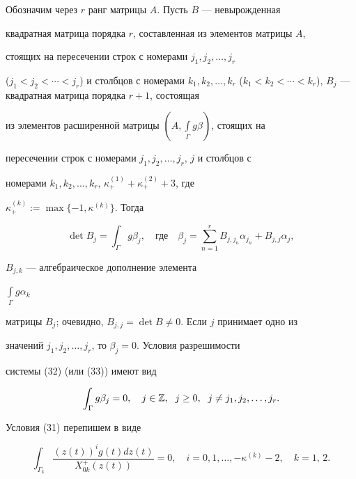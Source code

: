 Обозначим через $r$ ранг матрицы $A$. Пусть $B$ --- невырожденная


квадратная матрица порядка $r$, составленная из элементов матрицы $A$,


стоящих на пересечении строк с номерами $j_1,j_2,\dotsc,j_r$


($j_1<j_2<\dotsb<j_r$) и столбцов с номерами $k_1,k_2,\dotsc,k_r$ ($k_1<


k_2<\dotsb<k_r$), $B_j$ --- квадратная матрица порядка $r+1$, состоящая


из элементов расширенной матрицы $(A,\int\limits_\Gamma g\beta)$, стоящих на


пересечении строк с номерами $j_1,j_2,\dotsc,j_r,\,j$ и столбцов с


номерами $k_1,k_2,\dotsc,k_r,\, \kappa_+^{(1)}+\kappa_+^{(2)}+3$, где


$\kappa_+^{(k)}:=\max\{-1,\kappa^{(k)}\}$. Тогда


$$


\det B_j=\int_\Gamma g\beta_j,


\quad\text{где}\quad


\beta_j=\sum_{n=1}^{r}B_{j,j_n}\alpha_{j_n} +B_{j,j}\alpha_j,


$$


$B_{j,k}$ --- алгебраическое дополнение элемента


$\int\limits_\Gamma g\alpha_k$


матрицы $B_j$; очевидно, $B_{j,j}=\det B\ne 0$. Если $j$ принимает одно из


значений $j_1, j_2,\dotsc,j_r$, то $\beta_j=0$. Условия разрешимости


системы (32) (или (33)) имеют вид


\begin{equation}


\int_\Gamma g\beta_j=0,\quad


j\in \Bbb Z,\ \; j\ge 0,\ \; j\ne j_1,j_2,\dotsc, j_r.


\end{equation}





Условия (31) перепишем в виде


\begin{equation}


\int_{\Gamma_k}\frac{(z(t))^ig(t)dz(t)}{X^+_{0k}(z(t))}=0,\quad


i=0,1,\dotsc,-\kappa^{(k)}-2,\quad k=1,\,2.


\end{equation}





